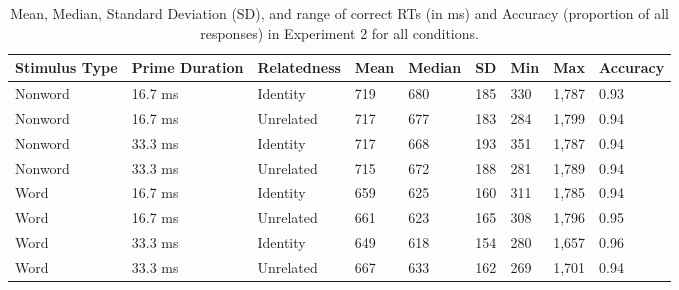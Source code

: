 \documentclass[
  english,
  man,floatsintext]{apa6}
\begin{document}
\begin{table}[tbp]

\begin{center}
\begin{threeparttable}

\caption{\label{tab:exp2-descriptive-rt-table}Mean, Median, Standard Deviation (SD), and range of correct RTs (in ms) and Accuracy (proportion of all responses) in Experiment 2 for all conditions.}

\begin{tabular}{lllllllll}
\toprule
Stimulus Type & \multicolumn{1}{c}{Prime Duration} & \multicolumn{1}{c}{Relatedness} & \multicolumn{1}{c}{Mean} & \multicolumn{1}{c}{Median} & \multicolumn{1}{c}{SD} & \multicolumn{1}{c}{Min} & \multicolumn{1}{c}{Max} & \multicolumn{1}{c}{Accuracy}\\
\midrule
Nonword & 16.7 ms & Identity & 719 & 680 & 185 & 330 & 1,787 & 0.93\\
Nonword & 16.7 ms & Unrelated & 717 & 677 & 183 & 284 & 1,799 & 0.94\\
Nonword & 33.3 ms & Identity & 717 & 668 & 193 & 351 & 1,787 & 0.94\\
Nonword & 33.3 ms & Unrelated & 715 & 672 & 188 & 281 & 1,789 & 0.94\\
Word & 16.7 ms & Identity & 659 & 625 & 160 & 311 & 1,785 & 0.94\\
Word & 16.7 ms & Unrelated & 661 & 623 & 165 & 308 & 1,796 & 0.95\\
Word & 33.3 ms & Identity & 649 & 618 & 154 & 280 & 1,657 & 0.96\\
Word & 33.3 ms & Unrelated & 667 & 633 & 162 & 269 & 1,701 & 0.94\\
\bottomrule
\end{tabular}

\end{threeparttable}
\end{center}

\end{table}
\end{document}

